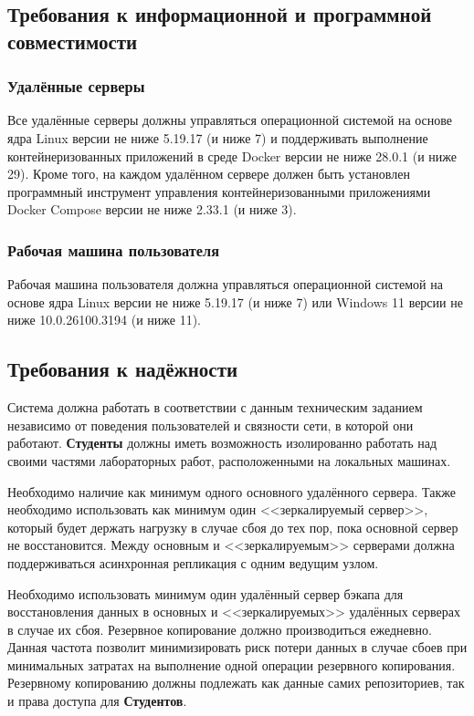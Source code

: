 \documentclass{bmstu}
\begin{document}
  \subsection{Требования к информационной и программной совместимости}

  \subsubsection{Удалённые серверы}

  Все удалённые серверы должны управляться операционной системой на основе
  ядра Linux версии не ниже 5.19.17 (и ниже 7) и поддерживать
  выполнение контейнеризованных приложений в среде Docker версии не
  ниже 28.0.1 (и ниже 29).
  Кроме того, на каждом удалённом сервере должен быть установлен программный
  инструмент управления контейнеризованными приложениями Docker
  Compose версии не ниже 2.33.1 (и ниже 3).

  \subsubsection{Рабочая машина пользователя}

  Рабочая машина пользователя должна управляться операционной системой
  на основе ядра Linux версии не ниже 5.19.17 (и ниже 7) или Windows
  11 версии не ниже 10.0.26100.3194 (и ниже 11).

  \subsection{Требования к надёжности}

  Система должна работать в соответствии с данным техническим заданием
  независимо от поведения пользователей и связности сети, в которой
  они работают.
  \textbf{Студенты} должны иметь возможность изолированно работать над своими
  частями лабораторных работ, расположенными на локальных машинах.
  
  Необходимо наличие как минимум одного основного удалённого сервера. 
  Также необходимо использовать как минимум один <<зеркалируемый сервер>>, 
  который будет держать нагрузку в случае сбоя до тех пор, пока основной 
  сервер не восстановится. Между основным и <<зеркалируемым>> серверами должна 
  поддерживаться асинхронная репликация с одним ведущим узлом. 
  
  Необходимо использовать минимум один удалённый сервер бэкапа для восстановления
  данных в основных и <<зеркалируемых>> удалённых серверах в случае их сбоя.
  Резервное копирование должно производиться ежедневно. Данная частота позволит
  минимизировать риск потери данных в случае сбоев при минимальных затратах на выполнение
  одной операции резервного копирования. Резервному копированию должны подлежать как
  данные самих репозиториев, так и права доступа для \textbf{Студентов}.
  
\end{document}

